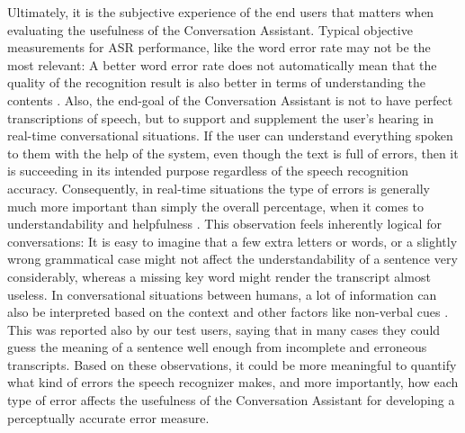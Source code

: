 \documentclass[english, 12pt, a4paper, pdftex, elec, utf8]{aaltothesis}
\begin{document}
Ultimately, it is the subjective experience of the end users that matters when evaluating the usefulness of the Conversation Assistant. Typical objective measurements for ASR performance, like the word error rate may not be the most relevant: A better word error rate does not automatically mean that the quality of the recognition result is also better in terms of understanding the contents \cite{wang2003word}. Also, the end-goal of the Conversation Assistant is not to have perfect transcriptions of speech, but to support and supplement the user's hearing in real-time conversational situations. If the user can understand everything spoken to them with the help of the system, even though the text is full of errors, then it is succeeding in its intended purpose regardless of the speech recognition accuracy. Consequently, in real-time situations the type of errors is generally much more important than simply the overall percentage, when it comes to understandability and helpfulness \cite{wang2003word}. This observation feels inherently logical for conversations: It is easy to imagine that a few extra letters or words, or a slightly wrong grammatical case might not affect the understandability of a sentence very considerably, whereas a missing key word might render the transcript almost useless. In conversational situations between humans, a lot of information can also be interpreted based on the context and other factors like non-verbal cues \cite{van2005transcription}. This was reported also by our test users, saying that in many cases they could guess the meaning of a sentence well enough from incomplete and erroneous transcripts. Based on these observations, it could be more meaningful to quantify what kind of errors the speech recognizer makes, and more importantly, how each type of error affects the usefulness of the Conversation Assistant for developing a perceptually accurate error measure. \\\\
\end{document}
